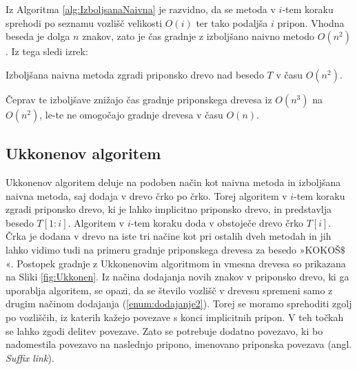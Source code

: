 
Iz Algoritma \ref{alg:IzboljsanaNaivna} je razvidno, da se metoda v $i$-tem koraku sprehodi po seznamu vozlišč velikosti $O(i)$ ter tako podaljša $i$ pripon. Vhodna beseda je dolga $n$ znakov, zato je čas gradnje z izboljšano naivno metodo $O(n^2)$. Iz tega sledi izrek:

\begin{izr}\label{izr:naivnaIzbolsana}
    Izboljšana naivna metoda zgradi priponsko drevo nad besedo $T$ v času $O(n^2)$.
\end{izr}

%

Čeprav te izboljšave znižajo čas gradnje priponskega drevesa iz $O(n^3)$ na $O(n^2)$, le-te ne omogočajo gradnje drevesa v času $O(n)$.



\subsection{Ukkonenov algoritem}
Ukkonenov algoritem deluje na podoben način kot naivna metoda in izboljšana naivna metoda, saj dodaja v drevo črko po črko. Torej algoritem v $i$-tem koraku zgradi priponsko drevo, ki je lahko implicitno priponsko drevo, in predstavlja besedo $T[1:i]$. Algoritem v $i$-tem koraku doda v obstoječe drevo črko $T[i]$. Črka je dodana v drevo na iste tri načine kot pri ostalih dveh metodah in jih lahko vidimo tudi na primeru gradnje priponskega drevesa za besedo »KOKOŠ$\$$«. Postopek gradnje z Ukkonenovim algoritmom in vmesna drevesa so prikazana na Sliki \ref{fig:Ukkonen}. Iz načina dodajanja novih znakov v priponsko drevo, ki ga uporablja algoritem, se opazi, da se število vozlišč v drevesu spremeni samo z drugim načinom dodajanja (\ref{enum:dodajanje2}). Torej se moramo sprehoditi zgolj po vozliščih, iz katerih kažejo povezave s konci implicitnih pripon. V teh točkah se lahko zgodi delitev povezave. Zato se potrebuje dodatno povezavo, ki bo nadomestila povezavo na naslednjo pripono, imenovano priponska povezava (angl. \textit{Suffix link}). 

